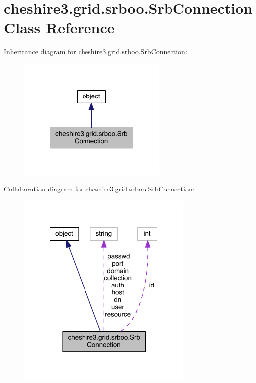\hypertarget{classcheshire3_1_1grid_1_1srboo_1_1_srb_connection}{\section{cheshire3.\-grid.\-srboo.\-Srb\-Connection Class Reference}
\label{classcheshire3_1_1grid_1_1srboo_1_1_srb_connection}
}


Inheritance diagram for cheshire3.\-grid.\-srboo.\-Srb\-Connection\-:
\nopagebreak
\begin{figure}[H]
\begin{center}
\leavevmode
\includegraphics[width=204pt]{classcheshire3_1_1grid_1_1srboo_1_1_srb_connection__inherit__graph}
\end{center}
\end{figure}


Collaboration diagram for cheshire3.\-grid.\-srboo.\-Srb\-Connection\-:
\nopagebreak
\begin{figure}[H]
\begin{center}
\leavevmode
\includegraphics[width=240pt]{classcheshire3_1_1grid_1_1srboo_1_1_srb_connection__coll__graph}
\end{center}
\end{figure}
